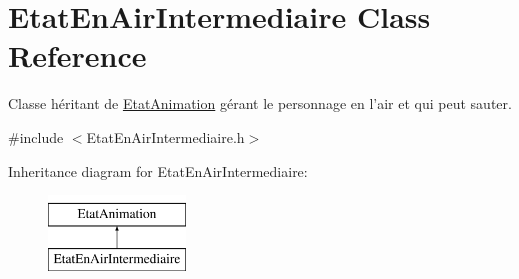 \hypertarget{classEtatEnAirIntermediaire}{\section{Etat\-En\-Air\-Intermediaire Class Reference}
\label{classEtatEnAirIntermediaire}
}


Classe héritant de \hyperlink{classEtatAnimation}{Etat\-Animation} gérant le personnage en l'air et qui peut sauter.  




{\ttfamily \#include $<$Etat\-En\-Air\-Intermediaire.\-h$>$}

Inheritance diagram for Etat\-En\-Air\-Intermediaire\-:\begin{figure}[H]
\begin{center}
\leavevmode
\includegraphics[height=2.000000cm]{classEtatEnAirIntermediaire}
\end{center}
\end{figure}
